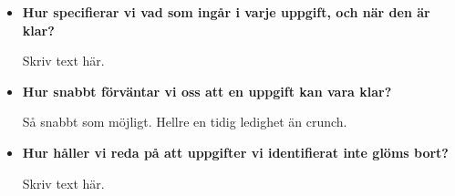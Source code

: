 \documentclass{mall}
\begin{document}
\begin{itemize}
\item \textbf{Hur specifierar vi vad som ingår i varje uppgift, och när den är klar?}

  Skriv text här.

\item \textbf{Hur snabbt förväntar vi oss att en uppgift kan vara klar?}

  Så snabbt som möjligt. Hellre en tidig ledighet än crunch.

\item \textbf{Hur håller vi reda på att uppgifter vi identifierat inte glöms bort?}

  Skriv text här.

\end{itemize}
\end{document}
